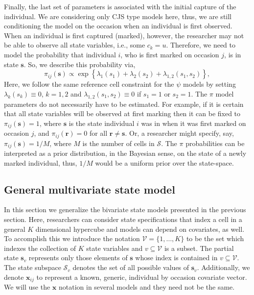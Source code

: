 \documentclass[fleqn]{article}
\newcommand{\bs}{\ensuremath{\mathbf{s}}}
\newcommand{\fS}{\ensuremath{\mathcal{S}}}
\newcommand{\br}{\ensuremath{\mathbf{r}}}
\newcommand{\fV}{\ensuremath{\mathcal{V}}}
\newcommand{\bx}{\ensuremath{\mathbf{x}}}
\begin{document}
Finally, the last set of parameters is associated with the initial capture of the individual. We are considering only CJS type models here, thus, we are still conditioning the model on the occasion when an individual is first observed. When an individual is first captured (marked), however, the researcher may not be able to observe all state variables, i.e., some $c_k = u$. Therefore, we need to model the probability that individual $i$, who is first marked on occasion $j$, is in state $\bs$. So, we describe this probability via,
\begin{equation}
\pi_{ij}(\bs) \propto \exp\left\{\lambda_1(s_1) + \lambda_2(s_2) + \lambda_{1,2}(s_1,s_2)\right\}, 
\end{equation}
Here, we follow the same reference cell constraint for the $\psi$ models by setting $\lambda_k(s_k)\equiv 0$, $k=1,2$ and $\lambda_{1,2}(s_1,s_2)\equiv 0$ if $s_1=1$ or $s_2=1$. The $\pi$ model parameters do not necessarily have to be estimated. For example, if it is certain that all state variables will be observed at first marking then it can be fixed to $\pi_{ij}(\bs) = 1$, where $\bs$ is the state individual $i$ was in when it was first marked on occasion $j$, and $\pi_{ij}(\br) = 0$ for all $\br\ne\bs$. Or, a researcher might specify, say, $\pi_{ij}(\bs) = 1/M$, where $M$ is the number of cells in $\fS$. The $\pi$ probabilities can be interpreted as a prior distribution, in the Bayesian sense, on the state of a newly marked individual, thus, $1/M$ would be a uniform prior over the state-space.
 
\subsection{General multivariate state model}

In this section we generalize the bivariate state models presented in the previous section. Here, researchers can consider state specifications that index a cell in a general $K$ dimensional hypercube and models can depend on covariates, as well. To accomplish this we introduce the notation $\fV = \{1,\dots,K\}$ to be the set which indexes the collection of $K$ state variables and $v\subseteq\fV$ is a subset. The partial state $\bs_v$ represents only those elements of $\bs$ whose index is contained in $v\subseteq\fV$. The state subspace $\fS_v$ denotes the set of all possible values of $\bs_v$. Additionally, we denote $\bx_{ij}$ to represent a known, generic, individual by occasion covariate vector. We will use the $\bx$ notation in several models and they need not be the same.
\end{document}
